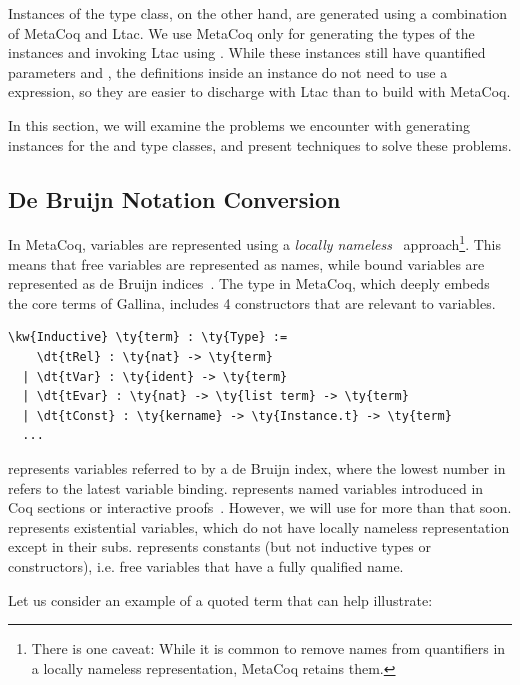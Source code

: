 Instances of the \InGraph{} type class, on the other hand, are generated using a combination of MetaCoq and \gls{Ltac}. We use MetaCoq only for generating the types of the instances and invoking \gls{Ltac} using \tmLemma{}. While these instances still have quantified \gls{parameter}s and \indices{}, the definitions inside an \InGraph{} instance do not need to use a  expression, so they are easier to discharge with \gls{Ltac} than to build with MetaCoq.

In this section, we will examine the problems we encounter with generating instances for the \GraphPredicate{} and \InGraph{} type classes, and present techniques to solve these problems.

\subsection{De Bruijn Notation Conversion}
\label{debruijnconversion}

In MetaCoq, variables are represented using a \emph{\gls{locally nameless}}~\cite{aydemir2008} approach\footnote{There is one caveat: While it is common to remove names from quantifiers in a \gls{locally nameless} representation, MetaCoq retains them.}. This means that free variables are represented as names, while bound variables are represented as de Bruijn indices~\cite{de1972lambda}. The  type in MetaCoq, which deeply embeds the core terms of \gls{Gallina}, includes 4 constructors that are relevant to variables.

\begin{Verbatim}
\kw{Inductive} \ty{term} : \ty{Type} :=
    \dt{tRel} : \ty{nat} -> \ty{term}
  | \dt{tVar} : \ty{ident} -> \ty{term}
  | \dt{tEvar} : \ty{nat} -> \ty{list term} -> \ty{term}
  | \dt{tConst} : \ty{kername} -> \ty{Instance.t} -> \ty{term}
  ...
\end{Verbatim}

 represents variables referred to by a de Bruijn index, where the lowest number in  refers to the latest variable binding.
 represents named variables introduced in Coq sections or interactive proofs~\cite{sozeau2020metacoq}. However, we will use  for more than that soon.
 represents existential variables, which do not have locally nameless representation except in their subs.
 represents constants (but not inductive types or constructors), i.e. free variables that have a fully qualified name.

Let us consider an example of a quoted term that can help illustrate:

